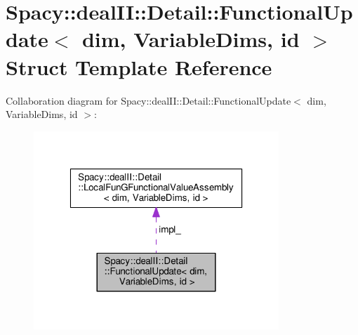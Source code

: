 \hypertarget{structSpacy_1_1dealII_1_1Detail_1_1FunctionalUpdate}{\section{Spacy\-:\-:deal\-I\-I\-:\-:Detail\-:\-:Functional\-Update$<$ dim, Variable\-Dims, id $>$ Struct Template Reference}
\label{structSpacy_1_1dealII_1_1Detail_1_1FunctionalUpdate}
}


Collaboration diagram for Spacy\-:\-:deal\-I\-I\-:\-:Detail\-:\-:Functional\-Update$<$ dim, Variable\-Dims, id $>$\-:
\nopagebreak
\begin{figure}[H]
\begin{center}
\leavevmode
\includegraphics[width=262pt]{structSpacy_1_1dealII_1_1Detail_1_1FunctionalUpdate__coll__graph}
\end{center}
\end{figure}
